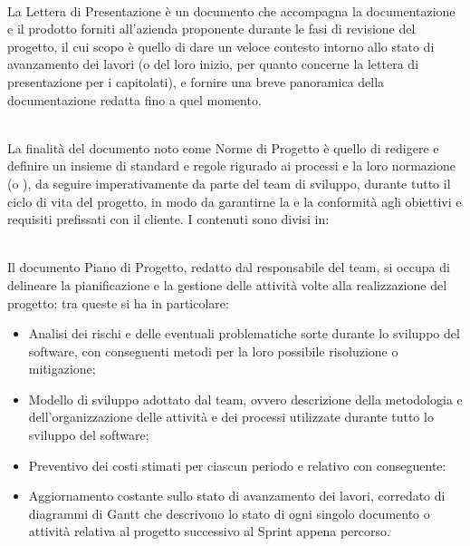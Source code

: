 \\
La Lettera di Presentazione è un documento che accompagna la documentazione e il prodotto forniti all'azienda proponente durante le fasi di revisione del progetto, il cui scopo è quello di dare un veloce contesto intorno allo stato di avanzamento dei lavori (o del loro inizio, per quanto concerne la lettera di presentazione per i capitolati), e fornire una breve panoramica della documentazione redatta fino a quel momento. 

\\
La finalità del documento noto come Norme di Progetto è quello di redigere e definire un insieme di standard e regole rigurado ai processi e la loro normazione (o ), da seguire imperativamente da parte del team di sviluppo, durante tutto il ciclo di vita del progetto, in modo da garantirne la  e la conformità agli obiettivi e requisiti prefissati con il cliente. I contenuti sono divisi in:

\\
Il documento Piano di Progetto, redatto dal responsabile del team, si occupa di delineare la pianificazione e la gestione delle attività volte alla realizzazione del progetto; tra queste si ha in particolare:
\begin{itemize}
    \item Analisi dei rischi e delle eventuali problematiche sorte durante lo sviluppo del software, con conseguenti metodi per la loro possibile risoluzione o mitigazione;
    \item Modello di sviluppo adottato dal team, ovvero descrizione della metodologia e dell'organizzazione delle attività e dei processi utilizzate durante tutto lo sviluppo del software; 
    \item Preventivo dei costi stimati per ciascun periodo e relativo  con conseguente:
    \item Aggiornamento costante sullo stato di avanzamento dei lavori, corredato di diagrammi di Gantt che descrivono lo stato di ogni singolo documento o attività relativa al progetto successivo al Sprint appena percorso.
\end{itemize}

